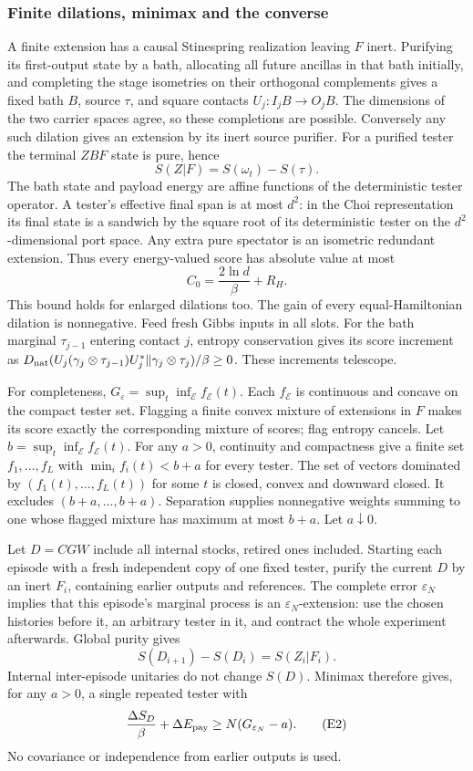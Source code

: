 \subsubsection{Finite dilations, minimax and the converse}
A finite extension has a causal Stinespring realization leaving \(F\)
inert. Purifying its first-output state by a bath, allocating all future
ancillas in that bath initially, and completing the stage isometries on
their orthogonal complements gives a fixed bath \(B\), source \(\tau\),
and square contacts \(U_j:I_jB\to O_jB\). The dimensions of the two
carrier spaces agree, so these completions are possible. Conversely any
such dilation gives an extension by its inert source purifier.
For a purified tester the terminal \(ZBF\) state is pure, hence
\[
 S(Z|F)=S(\omega_t)-S(\tau).
\]
The bath state and payload energy are affine functions of the deterministic
tester operator. A tester's effective final span is at most \(d^2\):
in the Choi representation its final state is a sandwich by the square
root of its deterministic tester on the \(d^2\)-dimensional port space.
Any extra pure spectator is an isometric redundant extension. Thus every
energy-valued score has absolute value at most
\[
 C_0=\frac{2\ln d}{\beta}+R_H.                         \tag{E1}
\]
This bound holds for enlarged dilations too.
The gain of every equal-Hamiltonian dilation is nonnegative. Feed fresh Gibbs
inputs in all slots. For the bath marginal \(\tau_{j-1}\) entering
contact \(j\), entropy conservation gives its score increment as
\(D_{\mathrm{nat}}(U_j(\gamma_j\otimes\tau_{j-1})U_j^*
\|\gamma_j\otimes\tau_j)/\beta\ge0\). These increments telescope.

For completeness, \(G_\varepsilon=\sup_t\inf_{\mathcal E}f_{\mathcal E}(t)\).
Each \(f_{\mathcal E}\) is continuous and concave on the compact tester
set. Flagging a finite convex mixture of extensions in \(F\) makes its
score exactly the corresponding mixture of scores; flag entropy cancels.
Let \(b=\sup_t\inf_{\mathcal E}f_{\mathcal E}(t)\). For any \(a>0\),
continuity and compactness give a finite set \(f_1,\ldots,f_L\) with
\(\min_i f_i(t)<b+a\) for every tester. The set of vectors dominated by
\((f_1(t),\ldots,f_L(t))\) for some \(t\) is closed, convex and downward
closed. It excludes \((b+a,\ldots,b+a)\). Separation supplies nonnegative
weights summing to one whose flagged mixture has maximum at most \(b+a\).
Let \(a\downarrow0\).

Let \(D=CGW\) include all internal stocks, retired ones included. Starting
each episode with a fresh independent copy of one fixed tester, purify
the current \(D\) by an inert \(F_i\), containing earlier outputs and
references. The complete error \(\varepsilon_N\) implies that this
episode's marginal process is an \(\varepsilon_N\)-extension: use the
chosen histories before it, an arbitrary tester in it, and contract the
whole experiment afterwards. Global purity gives
\[
 S(D_{i+1})-S(D_i)=S(Z_i|F_i).
\]
Internal inter-episode unitaries do not change \(S(D)\). Minimax therefore
gives, for any \(a>0\), a single repeated tester with
\[
 \frac{\Delta S_D}{\beta}+\Delta E_{\rm pay}
 \ge N(G_{\varepsilon_N}-a).                         \tag{E2}
\]
No covariance or independence from earlier outputs is used.

